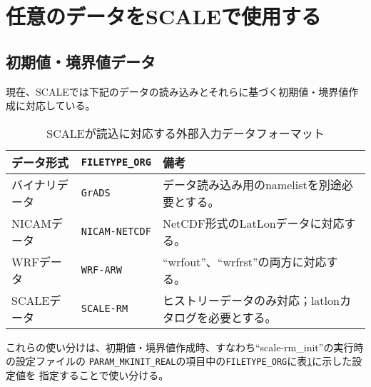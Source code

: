 \section{任意のデータをSCALEで使用する} \label{sec:adv_datainput}





\subsection{初期値・境界値データ} \label{sec:adv_bnddata}
現在、SCALEでは下記のデータの読み込みとそれらに基づく初期値・境界値作成に対応している。

\begin{table}[htb]
\begin{center}
\caption{SCALEが読込に対応する外部入力データフォーマット}
\begin{tabularx}{150mm}{|l|l|X|} \hline
 \rowcolor[gray]{0.9} データ形式 & \verb|FILETYPE_ORG| & 備考 \\ \hline
 バイナリデータ & \verb|GrADS| & データ読み込み用のnamelistを別途必要とする。 \\ \hline
 NICAMデータ &  \verb|NICAM-NETCDF| & NetCDF形式のLatLonデータに対応する。 \\ \hline
 WRFデータ &  \verb|WRF-ARW| & ``wrfout''、``wrfrst''の両方に対応する。 \\ \hline
 SCALEデータ &  \verb|SCALE-RM| & ヒストリーデータのみ対応；latlonカタログを必要とする。 \\ \hline
\end{tabularx}
\label{tab:inputdata_format}
\end{center}
\end{table}

これらの使い分けは、初期値・境界値作成時、すなわち``scale-rm\_init''の実行時の設定ファイルの
\verb|PARAM_MKINIT_REAL|の項目中の\verb|FILETYPE_ORG|に表\ref{tab:inputdata_format}に示した設定値を
指定することで使い分ける。

